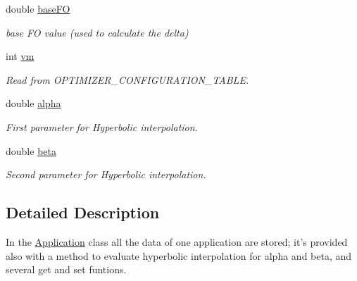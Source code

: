 \begin{DoxyCompactItemize}
double \hyperlink{classApplication_aa703e7525d446d98b5cd51c959d35998}{base\-F\-O}
\begin{DoxyCompactList}\small\item\em base F\-O value (used to calculate the delta) \end{DoxyCompactList}\item 
int \hyperlink{classApplication_a0a3fe386eb8244e536bc5297709d1269}{vm}
\begin{DoxyCompactList}\small\item\em Read from O\-P\-T\-I\-M\-I\-Z\-E\-R\-\_\-\-C\-O\-N\-F\-I\-G\-U\-R\-A\-T\-I\-O\-N\-\_\-\-T\-A\-B\-L\-E. \end{DoxyCompactList}\item 
double \hyperlink{classApplication_a57e16d80835a1911b72c63d5eeb5d2f2}{alpha}
\begin{DoxyCompactList}\small\item\em First parameter for Hyperbolic interpolation. \end{DoxyCompactList}\item 
double \hyperlink{classApplication_a356ffae49ae223b3d98b57e56210e3a9}{beta}
\begin{DoxyCompactList}\small\item\em Second parameter for Hyperbolic interpolation. \end{DoxyCompactList}\end{DoxyCompactItemize}


\subsection{Detailed Description}
In the \hyperlink{classApplication}{Application} class all the data of one application are stored; it's provided also with a method to evaluate hyperbolic interpolation for alpha and beta, and several get and set funtions. 


